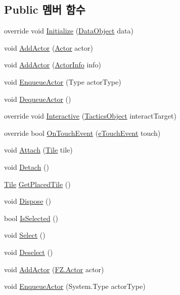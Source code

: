 \subsection*{Public 멤버 함수}
\begin{DoxyCompactItemize}
\item 
override void \hyperlink{class_action_object_afe93413cd4bfad308b8c357b4fd9dc30}{Initialize} (\hyperlink{class_data_object}{Data\+Object} data)
\item 
void \hyperlink{class_action_object_a56caea069fa424581114bd41b299944c}{Add\+Actor} (\hyperlink{class_f_z_1_1_actor}{Actor} actor)
\item 
void \hyperlink{class_action_object_a25c60d577ecf4dedb7d5af668fe1c8e7}{Add\+Actor} (\hyperlink{class_actor_info}{Actor\+Info} info)
\item 
void \hyperlink{class_action_object_a1aa21a0bbc88cf7456dd20005d55e972}{Enqueue\+Actor} (Type actor\+Type)
\item 
void \hyperlink{class_action_object_a57bca80c5d001408121c21ee46422976}{Dequeue\+Actor} ()
\item 
override void \hyperlink{class_action_object_a82d2b5b3c03a27d913df32d2bb9e8406}{Interactive} (\hyperlink{class_tactics_object}{Tactics\+Object} interact\+Target)
\item 
override bool \hyperlink{class_action_object_a0f3ad33fd4ec0478fbe397aaa92c257e}{On\+Touch\+Event} (\hyperlink{_touch_manager_8cs_ae33e321a424fe84ba8b2fdb81ad40a68}{e\+Touch\+Event} touch)
\item 
void \hyperlink{class_place_object_aa0f1a877d0abc20133e390d0964602ed}{Attach} (\hyperlink{class_tile}{Tile} tile)
\item 
void \hyperlink{class_place_object_a5bcf3ff3fd935121fbd699a08da217e2}{Detach} ()
\item 
\hyperlink{class_tile}{Tile} \hyperlink{class_place_object_a55363002bd68063cf079185a5729b76c}{Get\+Placed\+Tile} ()
\item 
void \hyperlink{class_place_object_aeac9db9685cc3134a90b6a2578046933}{Dispose} ()
\item 
bool \hyperlink{class_place_object_a55fd3f2bd6cccd98390c675371ab723e}{Is\+Selected} ()
\item 
void \hyperlink{class_place_object_a76b1b569fa2aa204ee8e2cb6a350694d}{Select} ()
\item 
void \hyperlink{class_place_object_ad54985fa9ccaf2df149af83b4f17892e}{Deselect} ()
\item 
void \hyperlink{interface_f_z_1_1_i_actor_queue_a913b199f922223b26cf05efa96c14139}{Add\+Actor} (\hyperlink{class_f_z_1_1_actor}{F\+Z.\+Actor} actor)
\item 
void \hyperlink{interface_f_z_1_1_i_actor_queue_ad0ffa88154fd9f44e0a8828b31a10c03}{Enqueue\+Actor} (System.\+Type actor\+Type)
\end{DoxyCompactItemize}
